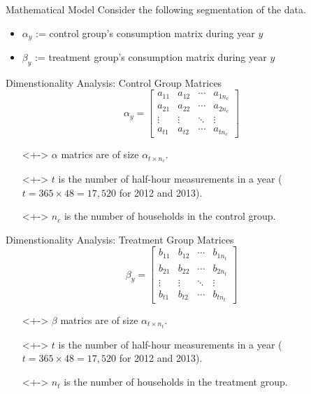 \documentclass{beamer}
\begin{document}
\begin{frame}{Mathematical Model}
  Consider the following segmentation of the data.
  \begin{itemize}
    \item $\alpha_y$ := control group's consumption matrix during year $y$
    \item $\beta_y$ := treatment group's consumption matrix during year $y$
  \end{itemize}
\end{frame}

\begin{frame}{Dimenstionality Analysis: Control Group Matrices}
  $$
  \alpha_y = \left[\begin{array}{cccc}
  a_{11} & a_{12} & \cdots & a_{1 n_c} \\
  a_{21} & a_{22} & \cdots & a_{2 n_c} \\
  \vdots & \vdots & \ddots & \vdots \\
  a_{t 1} & a_{t 2} & \cdots & a_{t n_c}
  \end{array}\right]
  $$
  \begin{itemize}
  \item[]<+-> $\alpha$ matrics are of size $\alpha_{t \times n_c}$.
  \item[]<+-> $t$ is the number of half-hour measurements in a year ($t = 365 \times 48 = 17,520$ for 2012 and 2013).
  \item[]<+-> $n_c$ is the number of households in the control group. 
  \end{itemize}
\end{frame}

\begin{frame}{Dimenstionality Analysis: Treatment Group Matrices}
  $$
  \beta_y = \left[\begin{array}{cccc}
  b_{11} & b_{12} & \cdots & b_{1 n_t} \\
  b_{21} & b_{22} & \cdots & b_{2 n_t} \\
  \vdots & \vdots & \ddots & \vdots \\
  b_{t 1} & b_{t 2} & \cdots & b_{t n_t}
  \end{array}\right]
  $$
  \begin{itemize}
  \item[]<+-> $\beta$ matrics are of size $\alpha_{t \times n_t}$.
  \item[]<+-> $t$ is the number of half-hour measurements in a year ($t = 365 \times 48 = 17,520$ for 2012 and 2013).
  \item[]<+-> $n_t$ is the number of households in the treatment group. 
  \end{itemize}
\end{frame}
\end{document}
